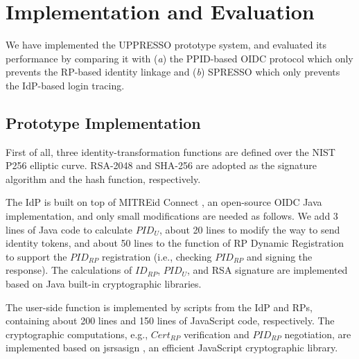 \section{Implementation and Evaluation}
\label{sec:implementation}
We have implemented the UPPRESSO prototype system, and evaluated its performance
 by comparing it with (\emph{a}) the PPID-based OIDC protocol \cite{MITREid}
    which only prevents the RP-based identity linkage
     and (\emph{b}) SPRESSO \cite{SPRESSO} which only prevents the IdP-based login tracing.

\subsection{Prototype Implementation}
First of all, three identity-transformation functions are defined over
        the NIST P256 elliptic curve.
RSA-2048 and SHA-256 are adopted as the signature algorithm and the hash function, respectively.

The IdP is built on top of MITREid Connect \cite{MITREid},
    an open-source OIDC Java implementation, %
    and only small modifications are needed as follows.
We add 3 lines of Java code to calculate $PID_U$,
     about 20 lines to modify the way to send identity tokens,
    and about 50 lines to the function of RP Dynamic Registration to support the $PID_{RP}$ registration
            (i.e., checking $PID_{RP}$ and signing the response).
The calculations of $ID_{RP}$, $PID_U$, and RSA signature are implemented based on Java built-in cryptographic libraries. %

The user-side function is implemented by scripts from the IdP and RPs,
     containing about 200 lines and 150 lines of JavaScript code, respectively.
The cryptographic computations, e.g., $Cert_{RP}$ verification and $PID_{RP}$ negotiation, are implemented based on jsrsasign \cite{jsrsasign}, an efficient JavaScript cryptographic library.

